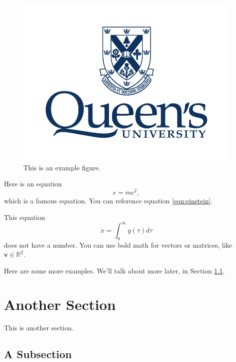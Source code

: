 \documentclass[12pt,letterpaper,fleqn,oneside]{qu-handout}
\newcommand{\Real}{\mathbb R}
\newcommand{\mbf}{\bm}
\begin{document}
\begin{figure}
  \begin{center}
    \includegraphics[width=\textwidth]{figs/example.png}
    \caption{This is an example figure.}
    \label{fig:example}
  \end{center}
\end{figure}

Here is an equation
\begin{equation}
  \label{eqn:einstein}
  e = mc^2,
\end{equation}
which is a famous equation.  You can reference equation \eqref{eqn:einstein}.

This equation
\begin{equation*}
  \dot{x} = \int_{0}^\infty y(\tau)d\tau
\end{equation*}
does not have a number.  You can use bold math for vectors or matrices, like $\mbf{v}\in\Real^2$.

Here are some more examples.  We'll talk about more later, in Section \ref{sec:special}.

\section{Another Section}

This is another section.

\subsection{A Subsection}
\label{sec:special}
\end{document}

